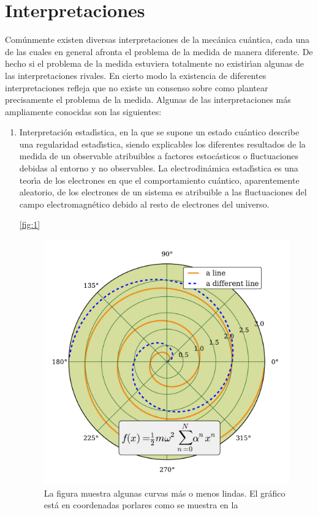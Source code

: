 \section{Interpretaciones}
\label{S:interpretaciones}

Com\'{u}nmente existen diversas interpretaciones de la mec\'{a}nica cu\'{a}ntica, cada una de las cuales en general afronta el problema de la medida de manera diferente. De hecho si el problema de la medida estuviera totalmente no existir\'{\i}an algunas de las interpretaciones rivales. En cierto modo la existencia de diferentes interpretaciones refleja que no existe un consenso sobre como plantear precisamente el problema de la medida. Algunas de las interpretaciones m\'{a}s ampliamente conocidas son las siguientes:

\begin{enumerate}
\item Interpretaci\'{o}n estad\'{\i}stica, en la que se supone un estado cu\'{a}ntico describe una
  regularidad estad\'{\i}stica, siendo explicables los diferentes resultados de la medida de un
  observable atribuibles a factores estoc\'{a}sticos o fluctuaciones debidas al entorno y no
  observables. La electrodin\'{a}mica estad\'{\i}stica es una teor\'{\i}a de los electrones en que el
  comportamiento cu\'{a}ntico, aparentemente aleatorio, de los electrones de un sistema es
  atribuible a las fluctuaciones del campo electromagn\'{e}tico debido al resto de electrones
  del universo.
  
  \autoref{fig:1}
  
\begin{figure}[ht]
\centering\includegraphics[width=\imsize]{cap2_f1}
\caption[La figura muestra algunas curvas m\'{a}s o menos lindas]{La figura muestra algunas curvas m\'{a}s o menos lindas. El gr\'{a}fico est\'{a} en coordenadas porlares como se muestra en la }
\end{figure}\label{fig:1}


\end{enumerate}
